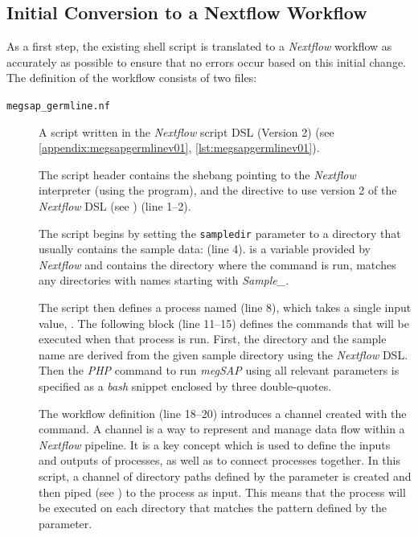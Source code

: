 \subsection{Initial Conversion to a Nextflow Workflow}\label{subsection:initialworkflow}
As a first step, the existing shell script is translated to a \textit{Nextflow} workflow as accurately as possible to ensure that no errors occur based on this initial change. The definition of the workflow consists of two files:
\begin{description}
    \item[\texttt{megsap\_germline.nf}] A script written in the \textit{Nextflow} script \ac{DSL} (Version 2) (see \cref{appendix:megsapgermlinev01}, \cref{lst:megsapgermlinev01}).
    
    The script header contains the shebang pointing to the \textit{Nextflow} interpreter (using the  program), and the directive to use version 2 of the \textit{Nextflow} \ac{DSL} (see \autocite{SeqeraLabs2022}) (line \numrange{1}{2}).
    
    The script begins by setting the \lstinline{sampledir} parameter to a directory that usually contains the sample data:  (line \num{4}).  is a variable provided by \textit{Nextflow} and contains the directory where the  command is run,  matches any directories with names starting with \textit{Sample\_}.
    
    The script then defines a process named  (line \num{8}), which takes a single input value, . The following  block (line \numrange{11}{15}) defines the commands that will be executed when that process is run. First, the directory and the sample name are derived from the given sample directory using the \textit{Nextflow} \ac{DSL}. Then the \textit{PHP} command to run \textit{\ac{megSAP}} using all relevant parameters is specified as a \textit{bash} snippet enclosed by three double-quotes.
    
    The workflow definition (line \numrange{18}{20}) introduces a channel created with the\linebreak{} command. A channel is a way to represent and manage data flow within a \textit{Nextflow} pipeline. It is a key concept which is used to define the inputs and outputs of processes, as well as to connect processes together. In this script, a channel of directory paths defined by the  parameter is created and then piped (see \autocite[Pipes]{SeqeraLabs2022}) to the  process as input. This means that the  process will be executed on each directory that matches the pattern defined by the  parameter.
    

\end{description}
